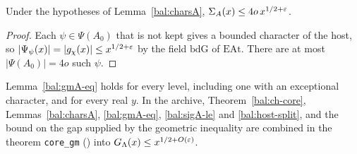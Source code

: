 \begin{lemma}\label{bal:sigA-le}
Under the hypotheses of Lemma~\ref{bal:charsA}, $\Sigma_A(x)\le4o\,x^{1/2+\varepsilon}$.
\end{lemma}
\begin{proof}
Each $\psi\in\Psi(A_0)$ that is not kept gives a bounded character of the host, so $|\Psi_{\psi}(x)|=|g_{\chi}(x)|\le x^{1/2+\varepsilon}$ by the field $\mathrm{bdG}$ of $\mathrm{EAt}$. There are at most $|\Psi(A_0)|=4o$ such $\psi$.
\end{proof}

\begin{remark}
Lemma~\ref{bal:gmA-eq} holds for every level, including one with an exceptional character, and for every real $y$. In the archive, Theorem~\ref{bal:ch-core}, Lemmas~\ref{bal:charsA}, \ref{bal:gmA-eq}, \ref{bal:sigA-le} and \ref{bal:host-split}, and the bound on the gap supplied by the geometric inequality are combined in the theorem \texttt{core\_gm} () into $G_{\Lambda}(x)\le x^{1/2+O(\varepsilon)}$.
\end{remark}
